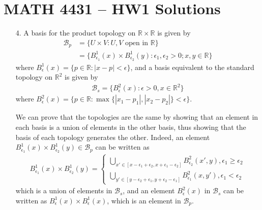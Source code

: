 \documentclass[a4paper,12pt]{article}
\begin{document}
\section*{MATH 4431 -- HW1 Solutions}
\begin{enumerate}
    \item[4.]
        A basis for the product topology on $\mathbb{R} \times \mathbb{R}$ is given by
        \begin{align*}
            \mathcal{B}_p &= \{ U \times V : U, V \text{ open in } \mathbb{R} \} \\
            &= \{ B_{\epsilon_1}^1(x) \times B_{\epsilon_2}^1(y) : \epsilon_1, \epsilon_2 > 0; x, y \in \mathbb{R} \}
        \end{align*}
        where $B_\epsilon^1(x) = \{ p \in \mathbb{R} : |x - p| < \epsilon \}$, and a basis equivalent to the standard topology on $\mathbb{R}^2$ is given by
        \begin{align*}
            \mathcal{B}_s = \{ B_\epsilon^2(x) : \epsilon > 0, x \in \mathbb{R}^2 \}
        \end{align*}
        where $B_\epsilon^2(x) = \{ p \in \mathbb{R} : \max\{ |x_1 - p_1|, |x_2 - p_2| \} < \epsilon \}$. \par
        We can prove that the topologies are the same by showing that an element in each basis is a union of elements in the other basis, thus showing that the basis of each topology generates the other. Indeed, an element $B_{\epsilon_1}^1(x) \times B_{\epsilon_2}^1(y) \in \mathcal{B}_p$ can be written as
        \begin{align*}
            B_{\epsilon_1}^1(x) \times B_{\epsilon_2}^1(y) = \begin{cases}
                \bigcup_{x' \in [x - \epsilon_1 + \epsilon_2, x + \epsilon_1 - \epsilon_2]} B_{\epsilon_2}^2(x', y), \epsilon_1 \geq \epsilon_2 \\
                \bigcup_{y' \in [y - \epsilon_2 + \epsilon_1, y + \epsilon_2 - \epsilon_1]} B_{\epsilon_1}^2(x, y'), \epsilon_1 < \epsilon_2
            \end{cases}
        \end{align*}
        which is a union of elements in $\mathcal{B}_s$, and an element $B_\epsilon^2(x)$ in $\mathcal{B}_s$ can be written as $B_\epsilon^1(x) \times B_\epsilon^1(x)$, which is an element in $\mathcal{B}_p$.


\end{enumerate}
\end{document}
